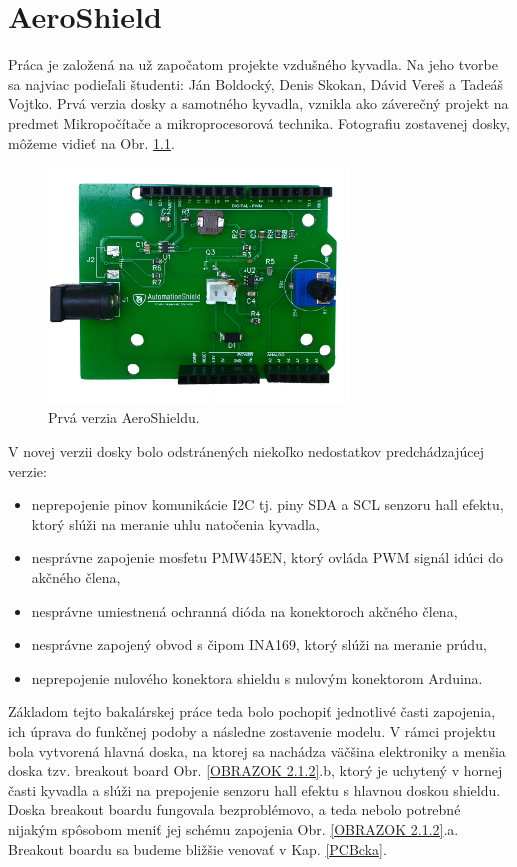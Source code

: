 \chapter{AeroShield}

Práca je založená na už započatom projekte vzdušného kyvadla. Na jeho tvorbe sa najviac podieľali študenti: Ján Boldocký, Denis Skokan, Dávid Vereš a Tadeáš Vojtko. Prvá verzia dosky a samotného kyvadla, vznikla ako záverečný projekt na predmet Mikropočítače a mikroprocesorová technika. Fotografiu zostavenej dosky, môžeme vidieť na Obr. \ref{OBRAZOK 2.1.1}.


\begin{figure}[tbh]
	\centering
	\includegraphics[width=80mm]{obr/oldshield.png}
	\caption{Prvá verzia AeroShieldu.}\label{OBRAZOK 2.1.1}
\end{figure}


V novej verzii dosky bolo odstránených niekoľko nedostatkov predchádzajúcej verzie:

\begin{itemize}
	\item neprepojenie pinov komunikácie I2C tj. piny SDA a SCL senzoru hall efektu, ktorý slúži na meranie uhlu natočenia kyvadla,
	\item nesprávne zapojenie mosfetu PMW45EN, ktorý ovláda PWM signál idúci do akčného člena,
	\item nesprávne umiestnená ochranná dióda na konektoroch akčného člena,
	\item nesprávne zapojený obvod s čipom INA169, ktorý slúži na meranie prúdu,
	\item neprepojenie nulového konektora shieldu s nulovým konektorom Arduina.
\end{itemize}

Základom tejto bakalárskej práce teda bolo pochopiť jednotlivé časti zapojenia, ich úprava do funkčnej podoby a následne zostavenie modelu. V rámci projektu bola vytvorená hlavná doska, na ktorej sa nachádza väčšina elektroniky a menšia doska tzv. breakout board Obr. \ref{OBRAZOK 2.1.2}.b, ktorý je uchytený v hornej časti kyvadla a slúži na prepojenie senzoru hall efektu s hlavnou doskou shieldu. Doska breakout boardu fungovala bezproblémovo, a teda nebolo potrebné nijakým spôsobom meniť jej schému zapojenia Obr. \ref{OBRAZOK 2.1.2}.a. Breakout boardu sa budeme bližšie venovať v Kap. \ref{PCBcka}.

